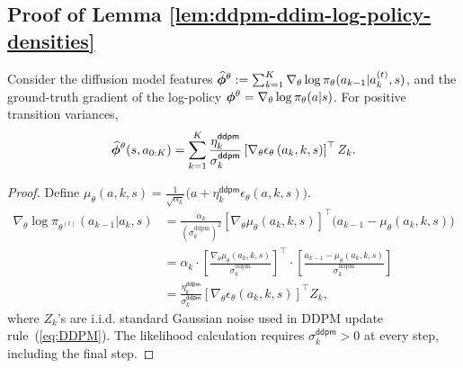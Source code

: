 \subsection{Proof of Lemma \ref{lem:ddpm-ddim-log-policy-densities}}

\begin{lem}
    Consider the diffusion model features $\widehat{\boldsymbol{\phi}}^\theta := \sum_{k=1}^K\nabla_\theta\log\pi_{\theta}(a_{k-1}|a_{k}^{(t)},s)$, and the ground-truth gradient of the log-policy ${\boldsymbol{\phi}}^\theta = \nabla_\theta\log\pi_{\theta}(a|s)$. For positive transition variances,
    $$\widehat{\boldsymbol{\phi}}^\theta(s,a_{0:K}) = \sum_{k=1}^K \frac{\eta_k^{\mathsf{ddpm}}}{\sigma_k^{\mathsf{ddpm}}}\left[\nabla_\theta \epsilon_\theta\left(a_k, k, s\right)\right]^{\top} Z_k.$$
    \label{lem:features-ddpm}
\end{lem}
\begin{proof}
    Define $\mu_{\theta}(a,k,s) = \frac{1}{\sqrt{\alpha_k}}\big(a + \eta_k^{\mathsf{ddpm}} \epsilon_{\theta}(a, k, s)\big)$.
    \begin{align*}
        \nabla_\theta\log\pi_{\theta^{(t)}}(a_{k-1}|a_{k},s) 
        &= \frac{\alpha_k}{(\sigma_k^{\mathrm{ddpm}})^2} \left[\nabla_\theta \mu_\theta(a_{k},k,s)\right]^\top \big(a_{k-1} - \mu_\theta(a_{k},k,s)\big)\\
        &= \alpha_k \cdot \left[\frac{\nabla_\theta \mu_\theta(a_{k},k,s)}{\sigma_k^{\mathrm{ddpm}}}\right]^\top \cdot \left[\frac{a_{k-1} - \mu_\theta(a_{k},k,s)}{\sigma_k^{\mathrm{ddpm}}}\right]\\
        &= \frac{\eta_k^{\mathsf{ddpm}}}{\sigma_k^{\mathsf{ddpm}}} [\nabla_\theta \epsilon_{\theta}(a_k, k, s)]^\top Z_k,
    \end{align*}
    where $Z_k$'s are i.i.d. standard Gaussian noise used in DDPM update rule~(\ref{eq:DDPM}). The likelihood calculation requires $\sigma_k^{\mathsf{ddpm}}>0$ at every step, including the final step.
\end{proof}



